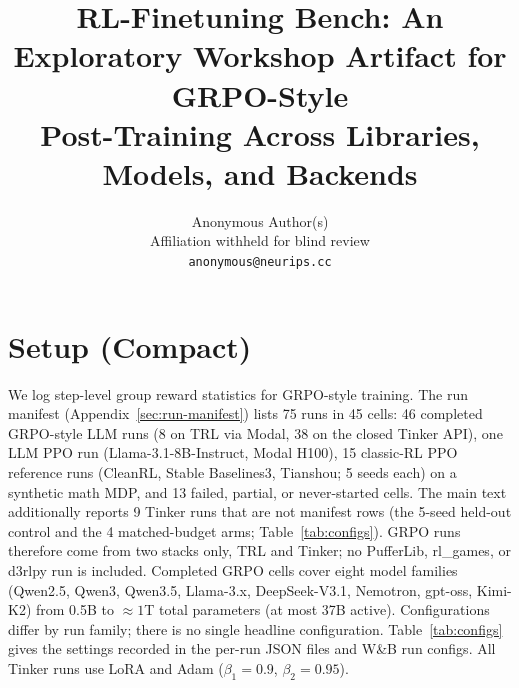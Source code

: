 \documentclass{article}
\title{RL-Finetuning Bench: An Exploratory Workshop Artifact for GRPO-Style\\
Post-Training Across Libraries, Models, and Backends}
\author{%
  Anonymous Author(s)\\
  Affiliation withheld for blind review\\
  \texttt{anonymous@neurips.cc}%
}
\begin{document}
\sloppy
{}
\hfuzz=2pt

\maketitle




\section{Setup (Compact)}
\label{sec:setup}

We log step-level group reward statistics for GRPO-style training. The run
manifest (Appendix~\ref{sec:run-manifest}) lists 75 runs in 45 cells:
46 completed GRPO-style LLM runs (8 on TRL via Modal, 38 on the closed
Tinker API), one LLM PPO run (Llama-3.1-8B-Instruct, Modal H100), 15
classic-RL PPO reference runs (CleanRL, Stable Baselines3, Tianshou; 5 seeds
each) on a synthetic math MDP, and 13 failed, partial, or never-started cells.
The main text additionally reports 9 Tinker runs that are not manifest rows
(the 5-seed held-out control and the 4 matched-budget arms;
Table~\ref{tab:configs}). GRPO runs therefore come from two stacks only, TRL
and Tinker; no PufferLib, rl\_games, or d3rlpy run is included. Completed
GRPO cells cover eight model families (Qwen2.5, Qwen3, Qwen3.5, Llama-3.x,
DeepSeek-V3.1, Nemotron, gpt-oss, Kimi-K2) from 0.5B to ${\approx}1$T total
parameters (at most 37B active). Configurations differ by run family; there
is no single headline configuration. Table~\ref{tab:configs} gives the
settings recorded in the per-run JSON files and W\&B run configs. All Tinker
runs use LoRA and Adam ($\beta_1{=}0.9$, $\beta_2{=}0.95$).
\end{document}
